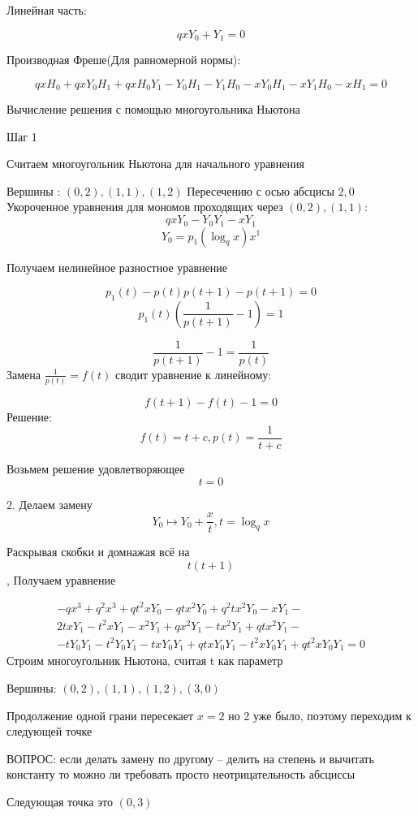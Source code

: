 \documentclass{article}
\begin{document}
	Линейная часть:
	
	$$qx Y_0 + Y_1 = 0 $$
	
	Производная Фреше(Для равномерной нормы):
	
	$$ qx H_0 + qx Y_0 H_1 + qx H_0 Y_1 -Y_0 H_1 - Y_1 H_0 - x Y_0 H_1 - x Y_1 H_0 - x H_1 =0 $$
	
	
	Вычисление решения с помощью многоугольника Ньютона
	
	Шаг 1
	
	Считаем многоугольник Ньютона для начального уравнения
	
	Вершины : $ (0, 2), (1, 1), (1,2)  $
	Пересечению с осью абсцисы $2,0$
	Укороченное уравнения для мономов проходящих через $(0, 2), (1, 1)$:
	$$ qx Y_0 - Y_0 Y_1 - xY_1 $$
	$$ Y_0 = p_1(\log_q x) x^1$$
	
	Получаем нелинейное разностное уравнение
	
	$$ p_1(t) - p(t)p(t+1) - p(t+1) = 0   $$
	$$ p_1(t) (\frac{1}{p(t+1)}-1)=1   $$
	
	$$ \frac{1}{p(t+1)}-1 = \frac{1}{p(t)}  $$
	Замена $ \frac{1}{p(t)} = f(t)   $ сводит уравнение к линейному:
	
	$$ f(t+1)-f(t)-1 = 0  $$
	Решение: $$ f(t) = t+c, p(t) = \frac{1}{t+c}   $$
	
	Возьмем решение удовлетворяющее $$ t = 0 $$
	
	2. Делаем замену $$ Y_0 \mapsto Y_0 + \frac{x}{t}, t= \log_q x $$
	
	Раскрывая скобки и домнажая всё на $$t(t+1)$$, Получаем уравнение
	
	\begin{multline}
		-q x^3 + q^2 x^3 + q t^2 x Y_0 - q t x^2 Y_0 + q^2 t x^2 Y_0 - x Y_1 -\\
		2 t x Y_1 - t^2 x Y_1 - x^2 Y_1 + q x^2 Y_1 - t x^2 Y_1 + q t x^2 Y_1 -\\-
		t Y_0 Y_1 - t^2 Y_0 Y_1 - t x Y_0 Y_1 + q t x Y_0 Y_1 - t^2 x Y_0 Y_1 + 
		q t^2 x Y_0 Y_1 = 0
	\end{multline}
	Строим многоугольник Ньютона, считая t как параметр 
	
	Вершины: $ (0,2), (1,1),(1,2),(3,0)$
	
	Продолжение одной грани пересекает $x=2$ но 2 уже было, поэтому переходим к следующей точке
	
	ВОПРОС: если делать замену по другому -- делить на степень и вычитать константу то можно ли требовать просто неотрицательность абсциссы
	
	Следующая точка это $(0,3)$
	
\end{document}
